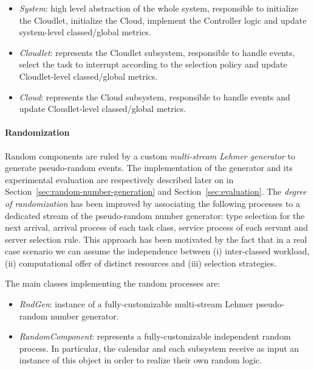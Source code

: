\begin{itemize}
	
	\item \textit{System}: high level abstraction of the whole system, responsible to initialize the Cloudlet, initialize the Cloud, implement the Controller logic and update system-level classed/global metrics.
	
	\item \textit{Cloudlet}: represents the Cloudlet subsystem, responsible to handle events, select the task to interrupt according to the selection policy and update Cloudlet-level classed/global metrics.
	
	\item \textit{Cloud}: represents the Cloud subsystem, responsible to handle events and update Cloudlet-level classed/global metrics.
	
\end{itemize}

\paragraph{Randomization}
Random components are ruled by a custom \textit{multi-stream Lehmer generator} to generate pseudo-random events.
The implementation of the generator and its experimental evaluation are respectively described later on in Section~\ref{sec:random-number-generation} and Section~\ref{sec:evaluation}.
The \textit{degree of randomization} has been improved by associating the following processes to a dedicated stream of the pseudo-random number generator: type selection for the next arrival, arrival process of each task class, service process of each servant and server selection rule.
This approach has been motivated by the fact that in a real case scenario we can assume the independence between (i) inter-classed workload, (ii) computational offer of distinct resources and (iii) selection strategies.

The main classes implementing the random processes are:

\begin{itemize}
	
	\item \textit{RndGen}: instance of a fully-customizable multi-stream Lehmer pseudo-random number generator.
	
	\item \textit{RandomComponent}: represents a fully-customizable independent random process. In particular, the calendar and each subsystem receive as input an instance of this object in order to realize their own random logic.
	
\end{itemize}

